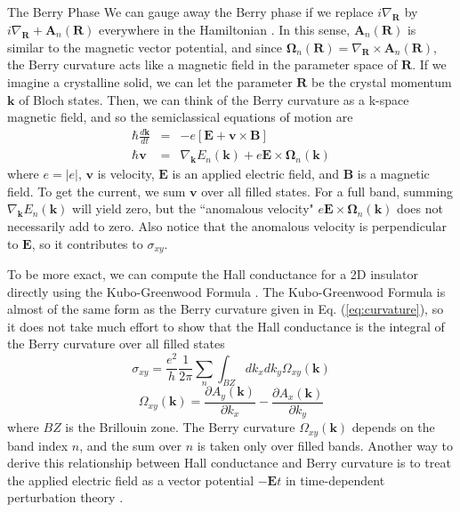 \documentclass[a4paper,12pt]{article}
\renewcommand{\vec}[1]{\boldsymbol{\mathbf{#1}}}
\begin{document}
\begin{section}{The Berry Phase}
We can gauge away the Berry phase if we replace $i \nabla_{\vec{R}}$ by $i \nabla_{\vec{R}}+\vec{A}_n(\vec{R})$ everywhere in the Hamiltonian \cite{louie}.  In this sense, $\vec{A}_n(\vec{R})$ is similar to the magnetic vector potential, and since $\vec{\Omega}_n(\vec{R}) = \nabla_{\vec{R}} \times \vec{A}_n(\vec{R})$, the Berry curvature acts like a magnetic field in the parameter space of $\vec{R}$.  If we imagine a crystalline solid, we can let the parameter $\vec{R}$ be the crystal momentum $\vec{k}$ of Bloch states.  Then, we can think of the Berry curvature as a k-space magnetic field, and so the semiclassical equations of motion are \cite{luttinger}
\begin{eqnarray}
\hbar \frac{d\vec{k}}{dt}&=&-e \left[ \vec{E}+\vec{v} \times \vec{B} \right] \\
\hbar \vec{v}&=&\nabla_{\vec{k}}E_n(\vec{k})+e \vec{E} \times \vec{\Omega}_n(\vec{k})
\end{eqnarray}
where $e=|e|$, $\vec{v}$ is velocity, $\vec{E}$ is an applied electric field, and $\vec{B}$ is a magnetic field.  To get the current, we sum $\vec{v}$ over all filled states.  For a full band, summing $\nabla_{\vec{k}}E_n(\vec{k})$ will yield zero, but the ``anomalous velocity" $e \vec{E} \times \vec{\Omega}_n(\vec{k})$ does not necessarily add to zero.  Also notice that the anomalous velocity is perpendicular to $\vec{E}$, so it contributes to $\sigma_{xy}$.

To be more exact, we can compute the Hall conductance for a 2D insulator directly using the Kubo-Greenwood Formula \cite{tknn}.  The Kubo-Greenwood Formula is almost of the same form as the Berry curvature given in Eq. (\ref{eq:curvature}), so it does not take much effort to show that the Hall conductance is the integral of the Berry curvature over all filled states
\begin{equation}
\sigma_{xy}=\frac{e^2}{h} \frac{1}{2 \pi} \sum_n \int_{BZ} dk_x dk_y \Omega_{xy}(\vec{k})
\end{equation}
\begin{equation}
\Omega_{xy}(\vec{k})=\frac{\partial A_y(\vec{k})}{\partial k_x} - \frac{\partial A_x(\vec{k})}{\partial k_y}
\end{equation}
where $BZ$ is the Brillouin zone.  The Berry curvature $\Omega_{xy}(\vec{k})$ depends on the band index $n$, and the sum over $n$ is taken only over filled bands.  Another way to derive this relationship between Hall conductance and Berry curvature is to treat the applied electric field as a vector potential $-\vec{E}t$ in time-dependent perturbation theory \cite{berry_electronic}.

\end{section}
\end{document}
